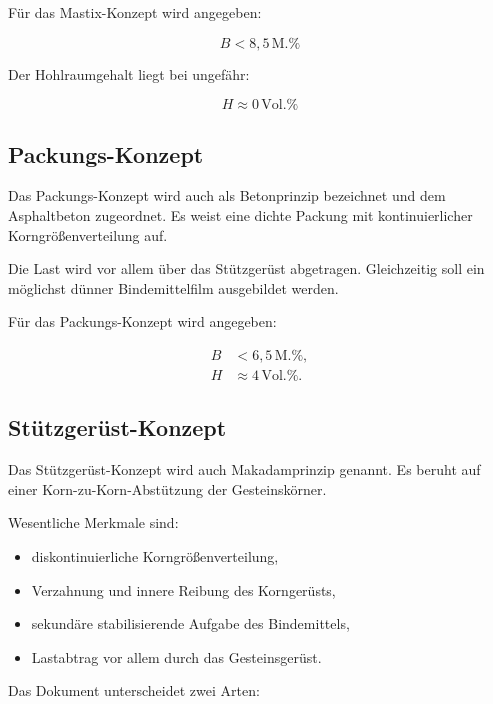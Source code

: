 \documentclass[
  12pt,
  a4paper,
  oneside
]{scrreprt}
\begin{document}
Für das Mastix-Konzept wird angegeben:

\begin{equation}
  B < 8{,}5\,\mathrm{M.\%}
\end{equation}

Der Hohlraumgehalt liegt bei ungefähr:

\begin{equation}
  H \approx 0\,\mathrm{Vol.\%}
\end{equation}



\subsection{Packungs-Konzept}

Das Packungs-Konzept wird auch als Betonprinzip bezeichnet und dem
Asphaltbeton zugeordnet. Es weist eine dichte Packung mit
kontinuierlicher Korngrößenverteilung auf.


Die Last wird vor allem über das Stützgerüst abgetragen. Gleichzeitig
soll ein möglichst dünner Bindemittelfilm ausgebildet werden.


Für das Packungs-Konzept wird angegeben:

\begin{align}
  B &< 6{,}5\,\mathrm{M.\%}, \\
  H &\approx 4\,\mathrm{Vol.\%}.
\end{align}



\subsection{Stützgerüst-Konzept}

Das Stützgerüst-Konzept wird auch Makadamprinzip genannt. Es beruht auf
einer Korn-zu-Korn-Abstützung der Gesteinskörner.


Wesentliche Merkmale sind:

\begin{itemize}
  \item diskontinuierliche Korngrößenverteilung,
  \item Verzahnung und innere Reibung des Korngerüsts,
  \item sekundäre stabilisierende Aufgabe des Bindemittels,
  \item Lastabtrag vor allem durch das Gesteinsgerüst.
\end{itemize}



Das Dokument unterscheidet zwei Arten:
\end{document}
